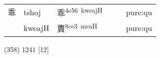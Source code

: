\documentclass[14pt,a4paper]{scrartcl}
\begin{document}
\begin{longtable}[c]{@{}llllll@{}}
\begin{minipage}[t]{0.14\columnwidth}\raggedright\strut
乖
\strut\end{minipage} &
\begin{minipage}[t]{0.14\columnwidth}\raggedright\strut
tshoj
\strut\end{minipage} &
\begin{minipage}[t]{0.14\columnwidth}\raggedright\strut
乖\textsuperscript{4e56~kweajH}
\strut\end{minipage} &
\begin{minipage}[t]{0.14\columnwidth}\raggedright\strut
\strut\end{minipage} &
\begin{minipage}[t]{0.14\columnwidth}\raggedright\strut
\strut\end{minipage} &
\begin{minipage}[t]{0.14\columnwidth}\raggedright\strut
pure:qu
\strut\end{minipage}\tabularnewline
\begin{minipage}[t]{0.14\columnwidth}\raggedright\strut
𧵽
\strut\end{minipage} &
\begin{minipage}[t]{0.14\columnwidth}\raggedright\strut
kweajH
\strut\end{minipage} &
\begin{minipage}[t]{0.14\columnwidth}\raggedright\strut
賣\textsuperscript{8ce3~meaH}
\strut\end{minipage} &
\begin{minipage}[t]{0.14\columnwidth}\raggedright\strut
\strut\end{minipage} &
\begin{minipage}[t]{0.14\columnwidth}\raggedright\strut
\strut\end{minipage} &
\begin{minipage}[t]{0.14\columnwidth}\raggedright\strut
pure:qu
\strut\end{minipage}\tabularnewline
\bottomrule
\end{longtable}

(358) 1241 {[}12{]}
\end{document}
